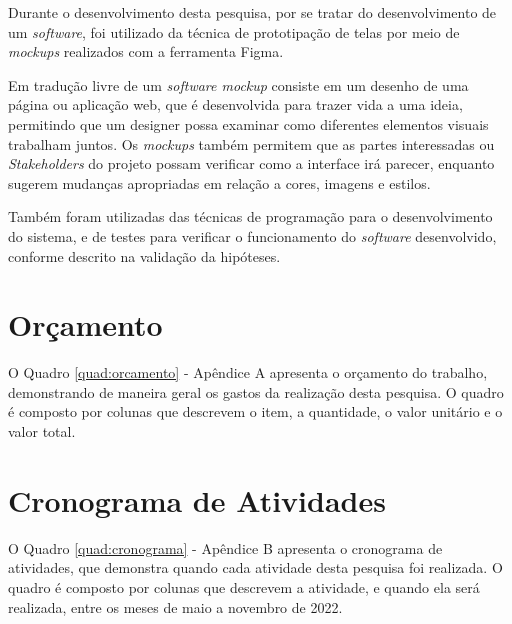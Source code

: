 Durante o desenvolvimento desta pesquisa, por se tratar do
desenvolvimento de um \emph{software}, foi utilizado da técnica
de prototipação de telas por meio de \emph{mockups} realizados
com a ferramenta Figma.

Em tradução livre de \cite{uzayr:mockups} um \emph{software mockup}
consiste em um desenho de uma página ou aplicação web,
que é desenvolvida para trazer vida a uma ideia, permitindo
que um designer possa examinar como diferentes elementos visuais
trabalham juntos. Os \emph{mockups} também permitem que as partes
interessadas ou \emph{Stakeholders} do projeto possam verificar como a
interface irá parecer, enquanto sugerem mudanças
apropriadas em relação a cores, imagens e estilos.

Também foram utilizadas das técnicas de programação para o desenvolvimento
do sistema, e de testes para verificar o funcionamento do \emph{software}
desenvolvido, conforme descrito na validação da hipóteses.

\section{Orçamento} \label{sec:budget}

O Quadro \ref*{quad:orcamento} - Apêndice A apresenta o orçamento do trabalho,
demonstrando de maneira geral os gastos da realização desta pesquisa. O quadro
é composto por colunas que descrevem o item, a quantidade, o valor unitário e
o valor total.

\section{Cronograma de Atividades} \label{sec:schedule_activities_table}

O Quadro \ref*{quad:cronograma} - Apêndice B apresenta o cronograma de
atividades, que demonstra quando cada atividade desta pesquisa foi realizada.
O quadro é composto por colunas que descrevem a atividade, e quando ela será
realizada, entre os meses de maio a novembro de 2022.